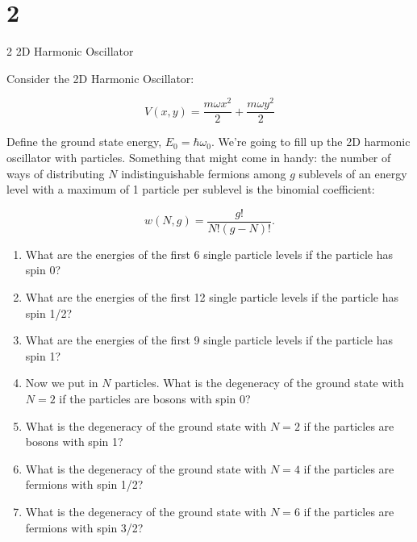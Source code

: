 \documentclass{article}
\begin{document}
\section*{2}
\begin{ques}
2 2D Harmonic Oscillator

Consider the 2D Harmonic Oscillator:

\[
V(x,y) = \frac{m\omega x^2}{2} + \frac{m\omega y^2}{2}
\]

Define the ground state energy, $E_0 = \hbar \omega_0$. We’re going to fill up the 2D harmonic oscillator
with particles. Something that might come in handy: the number of ways of distributing
$N$ indistinguishable fermions among $g$ sublevels of an energy level with a maximum of 1
particle per sublevel is the binomial coefficient:

\[
w(N,g) = \frac{g!}{N!(g-N)!}.
\]
\begin{enumerate}
\item What are the energies of the first 6 single particle levels if the particle has spin 0?

\item What are the energies of the first 12 single particle levels if the particle has spin 1/2?

\item What are the energies of the first 9 single particle levels if the particle has spin 1?

\item Now we put in $N$ particles. What is the degeneracy of the ground state with $N = 2$
if the particles are bosons with spin 0?

\item What is the degeneracy of the ground state with $N = 2$ if the particles are bosons
with spin 1?

\item What is the degeneracy of the ground state with $N = 4$ if the particles are fermions
with spin 1/2?

\item What is the degeneracy of the ground state with $N = 6$ if the particles are fermions
with spin 3/2?
\end{enumerate}
\end{ques}
\end{document}
